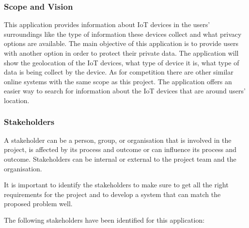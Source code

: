 \subsubsection{Scope and Vision}

This application provides information about IoT devices in the users'
surroundings like the type of information
these devices collect and what privacy options are available. The main objective
of this application is to provide users with another option in order to protect
their private data. The application will show the geolocation of the IoT
devices, what type of device it is, what type of data is being collect by
the device. As for competition there are other similar
online systems with the same scope as this project. The application offers
an easier way to search for information about the IoT devices that are around users'
location.

\subsubsection{Stakeholders}

A stakeholder can be a person, group, or organisation that is involved in
the project, is affected by its process and outcome or can influence its
process and outcome. Stakeholders can be internal or external to the project
team and the organisation.

It is important to identify the stakeholders to make sure to get all the
right requirements for the project and to develop a system that can match
the proposed problem well.

The following stakeholders have been identified for this application:


